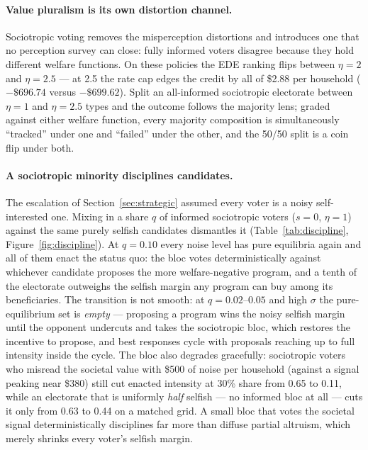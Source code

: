 \documentclass[11pt]{article}
\begin{document}
\paragraph{Value pluralism is its own distortion channel.} Sociotropic
voting removes the misperception distortions and introduces one that no
perception survey can close: fully informed voters disagree because they
hold different welfare functions. On these policies the EDE ranking
flips between \(\eta = 2\) and \(\eta = 2.5\) --- at 2.5 the rate cap
edges the credit by all of \$2.88 per household (\(-\$696.74\) versus
\(-\$699.62\)). Split an all-informed sociotropic electorate between
\(\eta = 1\) and \(\eta = 2.5\) types and the outcome follows the
majority lens; graded against either welfare function, every majority
composition is simultaneously ``tracked'' under one and ``failed'' under
the other, and the 50/50 split is a coin flip under both.

\paragraph{A sociotropic minority disciplines candidates.} The
escalation of Section~\ref{sec:strategic} assumed every voter is a noisy
self-interested one. Mixing in a share \(q\) of informed sociotropic
voters (\(s = 0\), \(\eta = 1\)) against the same purely selfish
candidates dismantles it (Table~\ref{tab:discipline},
Figure~\ref{fig:discipline}). At \(q = 0.10\) every noise level has
pure equilibria again and all of them enact the status quo: the bloc
votes deterministically against whichever candidate proposes the more
welfare-negative program, and a tenth of the electorate outweighs the
selfish margin any program can buy among its beneficiaries. The
transition is not smooth: at \(q = 0.02\)--\(0.05\) and high \(\sigma\)
the pure-equilibrium set is \emph{empty} --- proposing a program wins
the noisy selfish margin until the opponent undercuts and takes the
sociotropic bloc, which restores the incentive to propose, and best
responses cycle with proposals reaching up to full intensity inside
the cycle. The bloc also degrades gracefully: sociotropic voters who misread
the societal value with \$500 of noise per household (against a signal
peaking near \$380) still cut enacted intensity at 30\% share from 0.65
to 0.11, while an electorate that is uniformly \emph{half} selfish ---
no informed bloc at all --- cuts it only from 0.63 to 0.44 on a
matched grid. A small bloc that votes the societal signal
deterministically disciplines far more than diffuse partial altruism,
which merely shrinks every voter's selfish margin.
\end{document}
